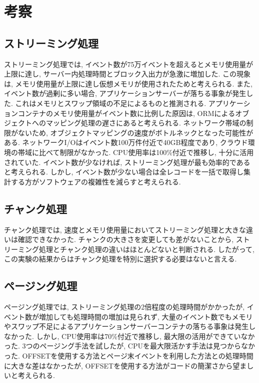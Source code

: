 \documentclass[../../main]{subfiles}
\begin{document}
    \section{考察}\label{sec:consideration}

    \subsection{ストリーミング処理}\label{subsec:consideration-streaming}

    ストリーミング処理では, イベント数が75万イベントを超えるとメモリ使用量が上限に達し, サーバー内処理時間とブロック入出力が急激に増加した. この現象は, メモリ使用量が上限に達し仮想メモリが使用されたためと考えられる. また, イベント数が過剰に多い場合, アプリケーションサーバーが落ちる事象が発生した. これはメモリとスワップ領域の不足によるものと推測される. アプリケーションコンテナのメモリ使用量がイベント数に比例した原因は, ORMによるオブジェクトへのマッピング処理の遅さにあると考えられる. ネットワーク帯域の制限がないため, オブジェクトマッピングの速度がボトルネックとなった可能性がある. ネットワークI/Oはイベント数100万件付近で40GB程度であり, クラウド環境の帯域に比べて制限がなかった. CPU使用率は100\%付近で推移し, 十分に活用されていた. イベント数が少なければ, ストリーミング処理が最も効率的であると考えられる. しかし, イベント数が少ない場合は全レコードを一括で取得し集計する方がソフトウェアの複雑性を減らすと考えられる.

    \subsection{チャンク処理}\label{subsec:consideration-chunk}

    チャンク処理では, 速度とメモリ使用量においてストリーミング処理と大きな違いは確認できなかった. チャンクの大きさを変更しても差がないことから, ストリーミング処理とチャンク処理の違いはほとんどないと判断される. したがって, この実験の結果からはチャンク処理を特別に選択する必要はないと言える.

    \subsection{ページング処理}\label{subsec:consideration-paging}

    ページング処理では, ストリーミング処理の2倍程度の処理時間がかかったが, イベント数が増加しても処理時間の増加は見られず, 大量のイベント数でもメモリやスワップ不足によるアプリケーションサーバーコンテナの落ちる事象は発生しなかった. しかし, CPU使用率は70\%付近で推移し, 最大限の活用ができていなかった. 3つのページング手法を試したが, CPUを最大限活かす手法は見つからなかった. OFFSETを使用する方法とページ末イベントを利用した方法との処理時間に大きな差はなかったが, OFFSETを使用する方法がコードの簡潔さから望ましいと考えられる.
\end{document}
